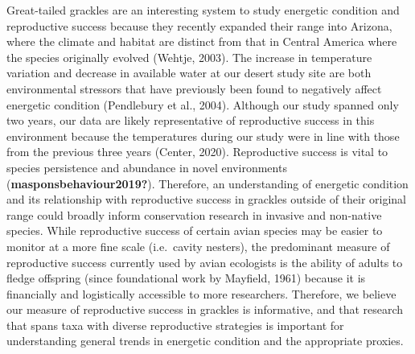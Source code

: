 \documentclass[
]{article}
\begin{document}
Great-tailed grackles are an interesting system to study energetic
condition and reproductive success because they recently expanded their
range into Arizona, where the climate and habitat are distinct from that
in Central America where the species originally evolved (Wehtje, 2003).
The increase in temperature variation and decrease in available water at
our desert study site are both environmental stressors that have
previously been found to negatively affect energetic condition
(Pendlebury et al., 2004). Although our study spanned only two years,
our data are likely representative of reproductive success in this
environment because the temperatures during our study were in line with
those from the previous three years (Center, 2020). Reproductive success
is vital to species persistence and abundance in novel environments
(\textbf{masponsbehaviour2019?}). Therefore, an understanding of
energetic condition and its relationship with reproductive success in
grackles outside of their original range could broadly inform
conservation research in invasive and non-native species. While
reproductive success of certain avian species may be easier to monitor
at a more fine scale (i.e.~cavity nesters), the predominant measure of
reproductive success currently used by avian ecologists is the ability
of adults to fledge offspring (since foundational work by Mayfield,
1961) because it is financially and logistically accessible to more
researchers. Therefore, we believe our measure of reproductive success
in grackles is informative, and that research that spans taxa with
diverse reproductive strategies is important for understanding general
trends in energetic condition and the appropriate proxies.
\end{document}
